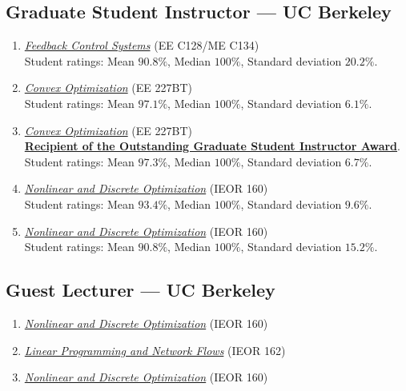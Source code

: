 \subsection{Graduate Student Instructor --- UC Berkeley}
\begin{enumerate}[label={\arabic*.}]
	\item \href{https://people.eecs.berkeley.edu/~sojoudi/Course_EE128_SP_2024.html}{\textit{Feedback Control Systems}} (EE C128/ME C134)  \\
	Student ratings: Mean $90.8\%$, Median $100\%$, Standard deviation $20.2\%$.
	\item \href{https://classes.berkeley.edu/content/2023-fall-eleng-227bt-001-lec-001}{\textit{Convex Optimization}} (EE 227BT)  \\
	Student ratings: Mean $97.1\%$, Median $100\%$, Standard deviation $6.1\%$.
	\item \href{https://classes.berkeley.edu/content/2022-fall-eleng-227bt-001-lec-001}{\textit{Convex Optimization}} (EE 227BT)  \\
	\textbf{\href{https://gsi.berkeley.edu/programs-services/award-programs/ogsi/ogsi-recipients-2022-2023/}{Recipient of the Outstanding Graduate Student Instructor Award}}. \\
	Student ratings: Mean $97.3\%$, Median $100\%$, Standard deviation $6.7\%$.
	\item \href{https://lavaei.ieor.berkeley.edu/Course_IEOR160_Fall_2021.html}{\textit{Nonlinear and Discrete Optimization}} (IEOR 160)  \\
	Student ratings: Mean $93.4\%$, Median $100\%$, Standard deviation $9.6\%$.
	\item \href{https://lavaei.ieor.berkeley.edu/Course_IEOR160_Fall_2020.html}{\textit{Nonlinear and Discrete Optimization}} (IEOR 160)  \\
	Student ratings: Mean $90.8\%$, Median $100\%$, Standard deviation $15.2\%$.
\end{enumerate}

\vspace*{\subsectionskip}

\subsection{Guest Lecturer --- UC Berkeley}

\begin{enumerate}[label={\arabic*.}]
	\item \href{https://lavaei.ieor.berkeley.edu/Course_IEOR160_Fall_2022.html}{\textit{Nonlinear and Discrete Optimization}} (IEOR 160) 
	\item \href{https://lavaei.ieor.berkeley.edu/Course_IEOR162_Fall_2022.html}{\textit{Linear Programming and Network Flows}} (IEOR 162) 
	\item \href{https://lavaei.ieor.berkeley.edu/Course_IEOR160_Fall_2021.html}{\textit{Nonlinear and Discrete Optimization}} (IEOR 160) 
\end{enumerate}

